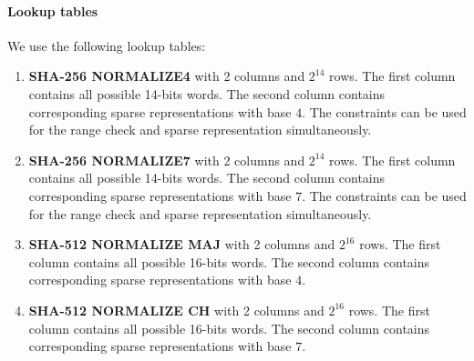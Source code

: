 \paragraph{Lookup tables} 
We use the following lookup tables:
\begin{enumerate}
\item \textbf{SHA-256 NORMALIZE4} with 2 columns and $2^{14}$ rows. 
The first column contains all possible 14-bits words.
The second column contains corresponding sparse representations with base $4$.
The constraints can be used for the range check and sparse representation simultaneously.
\item \textbf{SHA-256 NORMALIZE7} with 2 columns and $2^{14}$ rows. 
The first column contains all possible 14-bits words.
The second column contains corresponding sparse representations with base $7$.
The constraints can be used for the range check and sparse representation simultaneously.
\item \textbf{SHA-512 NORMALIZE MAJ} with 2 columns and $2^{16}$ rows. 
The first column contains all possible 16-bits words.
The second column contains corresponding sparse representations with base $4$.
\item \textbf{SHA-512 NORMALIZE CH} with 2 columns and $2^{16}$ rows. 
The first column contains all possible 16-bits words.
The second column contains corresponding sparse representations with base $7$.
\end{enumerate}

